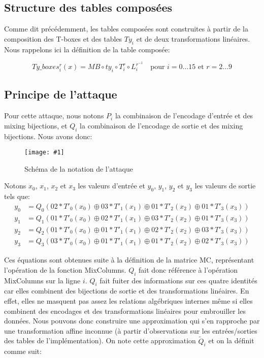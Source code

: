 \documentclass[a4paper, 10pt]{article}
\newcommand{\imagewidth}{0.9\textwidth}
\newcommand{\displayimage}[2]{
  \begin{figure}[H]
    \centering
    \texttt{[image: \#1]}
    \caption{#2}
  \end{figure}
}
\begin{document}
\subsection{Structure des tables composées}

Comme dit précédemment, les tables composées sont construites à partir de la composition des T-boxes et des tables 
$Ty_i$ et de deux transformations linéaires. Nous rappelons ici la définition de la table composée:

\[
  Ty\_boxes_{i}^{r}(x) = MB \circ ty_{i} \circ T_{i}^{r} \circ L_{i}^{r^{-1}} \quad \text{pour } i = 0 \ldots 15 \text{ et } r = 2 \ldots 9
\]

\subsection{Principe de l'attaque}

Pour cette attaque, nous notons $P_{i}$ la combinaison de l'encodage d'entrée et des mixing bijections, et 
$Q_{i}$ la combinaison de l'encodage de sortie et des mixing bijections. Nous avons donc:

\displayimage{images/schéma_notation_attaque.png}{Schéma de la notation de l'attaque}

Notons $x_{0}$, $x_{1}$, $x_{2}$ et $x_{3}$ les valeurs d'entrée et $y_{0}$, $y_{1}$, $y_{2}$ et $y_{3}$ 
les valeurs de sortie tels que:
\begin{align*}
  y_{0} &= Q_{0}(02 * T'_{0}(x_{0}) \oplus 03 * T'_{1}(x_{1}) \oplus 01 * T'_{2}(x_{2}) \oplus 01 * T'_{3}(x_{3})) \\
  y_{1} &= Q_{1}(01 * T'_{0}(x_{0}) \oplus 02 * T'_{1}(x_{1}) \oplus 03 * T'_{2}(x_{2}) \oplus 01 * T'_{3}(x_{3})) \\
  y_{2} &= Q_{2}(01 * T'_{0}(x_{0}) \oplus 01 * T'_{1}(x_{1}) \oplus 02 * T'_{2}(x_{2}) \oplus 03 * T'_{3}(x_{3})) \\
  y_{3} &= Q_{3}(03 * T'_{0}(x_{0}) \oplus 01 * T'_{1}(x_{1}) \oplus 01 * T'_{2}(x_{2}) \oplus 02 * T'_{3}(x_{3}))
\end{align*}

Ces équations sont obtenues suite à la définition de la matrice MC, représentant l'opération de la fonction 
MixColumns. $Q_{i}$ fait donc référence à l'opération MixColumns sur la ligne $i$. 
$Q_{i}$ fait fuiter des informations sur ces quatre identités car elles combinent 
des bijections de sortie et des transformations linéaires. En effet, elles ne masquent pas assez les relations 
algébriques internes même si elles combinent des encodages et des transformations linéaires pour embrouiller les 
données. Nous pouvons donc construire 
une approximation qui s'en rapproche par une transformation affine inconnue (à partir d'observations sur les 
entrées/sorties des tables de l'implémentation). On note cette approximation $\widetilde{Q}_{i}$
et on la définit comme suit:
\end{document}
